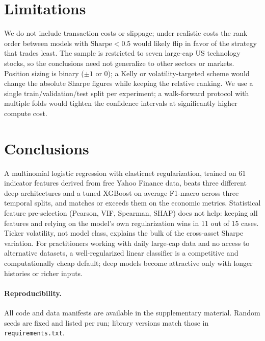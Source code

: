 \documentclass[runningheads]{llncs}
\begin{document}
\section{Limitations}
\label{sec:limitations}

We do not include transaction costs or slippage; under realistic costs the rank order between models with $\text{Sharpe}\!<\!0.5$ would likely flip in favor of the strategy that trades least. The sample is restricted to seven large-cap US technology stocks, so the conclusions need not generalize to other sectors or markets. Position sizing is binary ($\pm 1$ or $0$); a Kelly or volatility-targeted scheme would change the absolute Sharpe figures while keeping the relative ranking. We use a single train/validation/test split per experiment; a walk-forward protocol with multiple folds would tighten the confidence intervals at significantly higher compute cost.

\section{Conclusions}
\label{sec:conclusions}

A multinomial logistic regression with elasticnet regularization, trained on 61 indicator features derived from free Yahoo Finance data, beats three different deep architectures and a tuned XGBoost on average F1-macro across three temporal splits, and matches or exceeds them on the economic metrics. Statistical feature pre-selection (Pearson, VIF, Spearman, SHAP) does not help: keeping all features and relying on the model's own regularization wins in 11 out of 15 cases. Ticker volatility, not model class, explains the bulk of the cross-asset Sharpe variation. For practitioners working with daily large-cap data and no access to alternative datasets, a well-regularized linear classifier is a competitive and computationally cheap default; deep models become attractive only with longer histories or richer inputs.

\paragraph{Reproducibility.}
All code and data manifests are available in the supplementary material. Random seeds are fixed and listed per run; library versions match those in \texttt{requirements.txt}.
\end{document}
